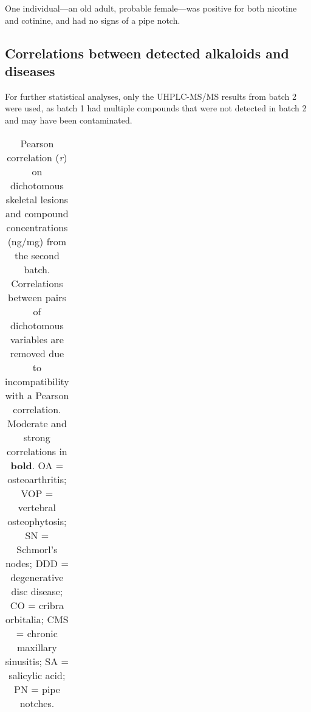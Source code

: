\documentclass[
  11pt,
  leqno]{scrartcl}
\begin{document}
One individual---an old adult, probable female---was positive for both
nicotine and cotinine, and had no signs of a pipe notch.

\subsection{Correlations between detected alkaloids and
diseases}\label{correlations-between-detected-alkaloids-and-diseases}

For further statistical analyses, only the UHPLC-MS/MS results from
batch 2 were used, as batch 1 had multiple compounds that were not
detected in batch 2 and may have been contaminated.

\begin{longtable}[]{@{}
  >{\raggedright\arraybackslash}p{}
  >{\raggedright\arraybackslash}p{}
  >{\raggedright\arraybackslash}p{}
  >{\raggedright\arraybackslash}p{}
  >{\raggedright\arraybackslash}p{}
  >{\raggedright\arraybackslash}p{}
  >{\raggedright\arraybackslash}p{}
  >{\raggedright\arraybackslash}p{}
  >{\raggedright\arraybackslash}p{}@{}}

\caption{\label{tbl-pearson}Pearson correlation (\emph{r}) on
dichotomous skeletal lesions and compound concentrations (ng/mg) from
the second batch. Correlations between pairs of dichotomous variables
are removed due to incompatibility with a Pearson correlation. Moderate
and strong correlations in \textbf{bold}. OA = osteoarthritis; VOP =
vertebral osteophytosis; SN = Schmorl's nodes; DDD = degenerative disc
disease; CO = cribra orbitalia; CMS = chronic maxillary sinusitis; SA =
salicylic acid; PN = pipe notches.}

\tabularnewline


\end{longtable}
\end{document}
